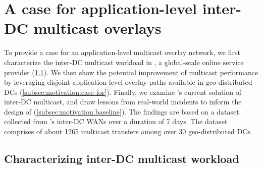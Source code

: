 \section{A case for application-level inter-DC multicast overlays}
\label{sec:motivation}


To provide a case for an
application-level multicast overlay network,
we first characterize the inter-DC multicast workload in
\company, a global-scale online service provider
(\Section\ref{subsec:motivation:multicast-traffic}).
We then show the potential improvement of multicast performance
by leveraging disjoint application-level overlay paths available in geo-distributed DCs
(\Section\ref{subsec:motivation:case-for}).
Finally, we examine \company's current solution of
inter-DC multicast, and draw lessons from real-world
incidents to inform the design of \name (\Section\ref{subsec:motivation:baseline}).
The findings are based on a dataset collected from \company's
inter-DC WANs over a duration of 7 days.
The dataset comprises of about 1265 multicast transfers
among over 30 geo-distributed DCs.




\subsection{Characterizing inter-DC multicast workload}
\label{subsec:motivation:multicast-traffic}


